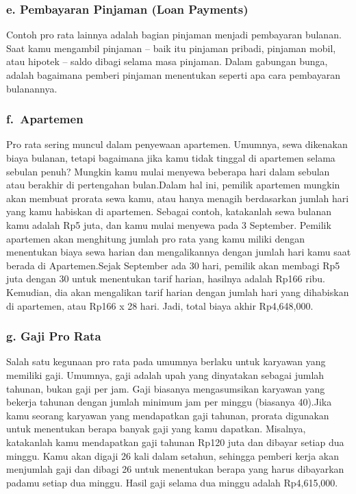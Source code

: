 \documentclass[
]{book}
\begin{document}
\hypertarget{e.-pembayaran-pinjaman-loan-payments}{%
\subsubsection*{e. Pembayaran Pinjaman (Loan Payments)}\label{e.-pembayaran-pinjaman-loan-payments}}

Contoh pro rata lainnya adalah bagian pinjaman menjadi pembayaran bulanan. Saat kamu mengambil pinjaman -- baik itu pinjaman pribadi, pinjaman mobil, atau hipotek -- saldo dibagi selama masa pinjaman. Dalam gabungan bunga, adalah bagaimana pemberi pinjaman menentukan seperti apa cara pembayaran bulanannya.

\hypertarget{f.-apartemen}{%
\subsubsection*{f.~Apartemen}\label{f.-apartemen}}

Pro rata sering muncul dalam penyewaan apartemen. Umumnya, sewa dikenakan biaya bulanan, tetapi bagaimana jika kamu tidak tinggal di apartemen selama sebulan penuh? Mungkin kamu mulai menyewa beberapa hari dalam sebulan atau berakhir di pertengahan bulan.Dalam hal ini, pemilik apartemen mungkin akan membuat prorata sewa kamu, atau hanya menagih berdasarkan jumlah hari yang kamu habiskan di apartemen. Sebagai contoh, katakanlah sewa bulanan kamu adalah Rp5 juta, dan kamu mulai menyewa pada 3 September. Pemilik apartemen akan menghitung jumlah pro rata yang kamu miliki dengan menentukan biaya sewa harian dan mengalikannya dengan jumlah hari kamu saat berada di Apartemen.Sejak September ada 30 hari, pemilik akan membagi Rp5 juta dengan 30 untuk menentukan tarif harian, hasilnya adalah Rp166 ribu. Kemudian, dia akan mengalikan tarif harian dengan jumlah hari yang dihabiskan di apartemen, atau Rp166 x 28 hari. Jadi, total biaya akhir Rp4,648,000.

\hypertarget{g.-gaji-pro-rata}{%
\subsubsection*{g. Gaji Pro Rata}\label{g.-gaji-pro-rata}}

Salah satu kegunaan pro rata pada umumnya berlaku untuk karyawan yang memiliki gaji. Umumnya, gaji adalah upah yang dinyatakan sebagai jumlah tahunan, bukan gaji per jam. Gaji biasanya mengasumsikan karyawan yang bekerja tahunan dengan jumlah minimum jam per minggu (biasanya 40).Jika kamu seorang karyawan yang mendapatkan gaji tahunan, prorata digunakan untuk menentukan berapa banyak gaji yang kamu dapatkan. Misalnya, katakanlah kamu mendapatkan gaji tahunan Rp120 juta dan dibayar setiap dua minggu. Kamu akan digaji 26 kali dalam setahun, sehingga pemberi kerja akan menjumlah gaji dan dibagi 26 untuk menentukan berapa yang harus dibayarkan padamu setiap dua minggu. Hasil gaji selama dua minggu adalah Rp4,615,000.
\end{document}
